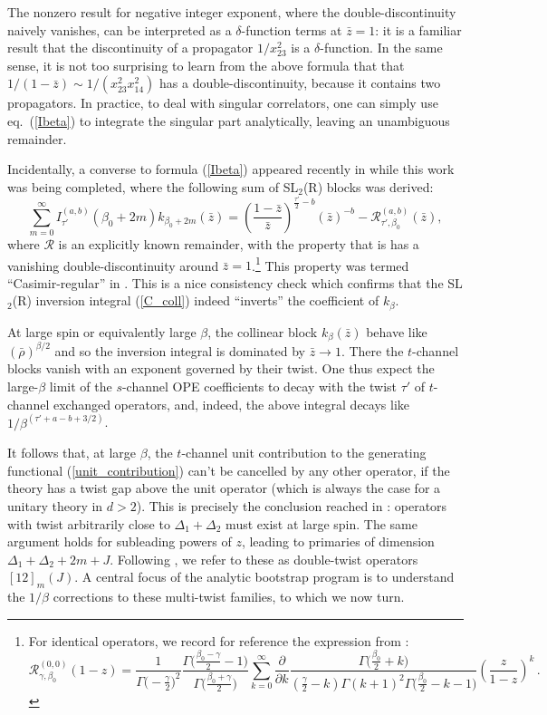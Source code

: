 \documentclass[11pt, reqno,preprint]{article}
\def\be{\begin{equation}}
\def\ee{\end{equation}}
\def\rhobar{\bar{\rho}}
\def\zbar{\bar{z}}
\def\j{J}
\begin{document}
The nonzero result for negative integer exponent, where the double-discontinuity naively vanishes,
can be interpreted as a $\delta$-function terms at $\zbar=1$:
it is a familiar result that the discontinuity of a propagator $1/x_{23}^2$ is a $\delta$-function.
In the same sense, it is not too surprising to learn from the above formula that
that $1/(1-\zbar)\sim 1/(x_{23}^2x_{14}^2)$ has a double-discontinuity, because it contains two propagators.
In practice, to deal with singular correlators, one can simply use eq.~(\ref{Ibeta}) to integrate the singular part analytically,
leaving an unambiguous remainder.

Incidentally, a converse to formula (\ref{Ibeta}) appeared recently in \cite{Simmons-Duffin:2016wlq} while this work
was being completed, where the following sum of SL${}_2$(R) blocks was derived:
\be
 \sum_{m=0}^\infty I^{(a,b)}_{\tau'}(\beta_0+2m) k_{\beta_0+2m}(\zbar) = \left(\frac{1-\zbar}{\zbar}\right)^{\frac{\tau'}{2}-b} (\zbar)^{-b}
 - \mathcal{R}^{(a,b)}_{\tau',\beta_0}(\zbar), \label{sl2_sum}
\ee
where $\mathcal{R}$ is an explicitly known remainder, with the property that is has
a vanishing double-discontinuity around $\zbar=1$.\footnote{
For identical operators, we record for reference the expression from \cite{Simmons-Duffin:2016wlq}:
\be
 \mathcal{R}_{\gamma,\beta_0}^{(0,0)}(1-z) =
 \frac{1}{\Gamma\big(-\tfrac{\gamma}{2}\big)^2}
 \frac{\Gamma\big(\tfrac{\beta_0-\gamma}{2}-1\big)}{\Gamma\big(\tfrac{\beta_0+\gamma}{2}\big)}
\sum_{k=0}^\infty
 \frac{\partial}{\partial k} \frac{\Gamma\big(\tfrac{\beta_0}{2} +k\big)}{(\tfrac{\gamma}{2}-k)\Gamma(k+1)^2
 \Gamma\big(\tfrac{\beta_0}{2} -k-1\big)} \left(\frac{z}{1-z}\right)^k\,. \label{remainder_expr}
\ee}
This property was termed ``Casimir-regular'' in \cite{Simmons-Duffin:2016wlq}.
This is a nice consistency check which confirms that the SL${}_2$(R) inversion integral (\ref{C_coll}) indeed ``inverts'' the coefficient of
$k_\beta$.

At large spin or equivalently large $\beta$,
the collinear block $k_{\beta}(\zbar)$ behave like $(\rhobar)^{\beta/2}$ and so the inversion
integral is dominated by $\zbar\to 1$. There the $t$-channel blocks vanish with an exponent governed by their twist.
One thus expect the large-$\beta$ limit of the $s$-channel OPE coefficients to decay with the twist $\tau'$
of $t$-channel exchanged operators,
and, indeed, the above integral decays like $1/\beta^{(\tau'+a-b+3/2)}$.

It follows that, at large $\beta$, the $t$-channel unit contribution to the generating functional (\ref{unit_contribution})
can't be cancelled by any other operator, if the theory has a twist gap above the unit operator (which is always the case for a unitary theory in $d>2$).
This is precisely the conclusion reached in \cite{Komargodski:2012ek,Fitzpatrick:2012yx}:
operators with twist arbitrarily close to $\Delta_1+\Delta_2$ must exist at large spin.
The same argument holds for subleading powers of $z$, leading
to primaries of dimension $\Delta_1+\Delta_2+2m+\j$. 
Following \cite{Simmons-Duffin:2016wlq}, we refer to these as double-twist operators $[12]_m(\j)$.
A central focus of the analytic bootstrap program is to understand the $1/\beta$ corrections to these multi-twist families,
to which we now turn.
\end{document}
